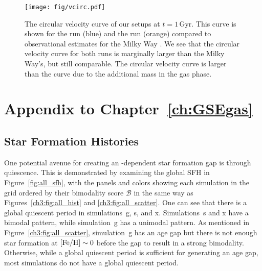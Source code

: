\begin{appendices}
\begin{figure}
    \centering
    \texttt{[image: fig/vcirc.pdf]}
    \caption{The circular velocity curve of our setups at $t=1\,\textrm{Gyr}$.
    This curve is shown for the \Nbody{} run (blue) and the \SMUGGLE{} run
    (orange) compared to observational estimates for the Milky Way
    \citep{2019ApJ...871..120E}. We see that the circular velocity curve for
    both runs is marginally larger than the Milky Way's, but still comparable.
    The \SMUGGLE{} circular velocity curve is larger than the \Nbody{} curve due
    to the additional mass in the gas phase.}
    \label{fig:vcirc}
\end{figure}

\chapter{Appendix to Chapter~\ref{ch:GSEgas}}\label{ch:app_GSEgas}

\section{Star Formation Histories}\label{ch3:app:all_sfh}
One potential avenue for creating an \FeH{}-dependent star formation gap is through quiescence. This is demonstrated by examining the global SFH in Figure~\ref{fig:all_sfh}, with the panels and colors showing each simulation in the grid ordered by their bimodality score $\mathcal{B}$ in the same way as Figures~\ref{ch3:fig:all_hist} and \ref{ch3:fig:all_scatter}. One can see that there is a global quiescent period in simulations~g, s, and x. Simulations~s and x have a bimodal pattern, while simulation~g has a unimodal pattern. As mentioned in Figure~\ref{ch3:fig:all_scatter}, simulation~g has an age gap but there is not enough star formation at $[\textrm{Fe}/\textrm{H}]\sim0$ before the gap to result in a strong bimodality. Otherwise, while a global quiescent period is sufficient for generating an age gap, most simulations do not have a global quiescent period.


\end{appendices}
